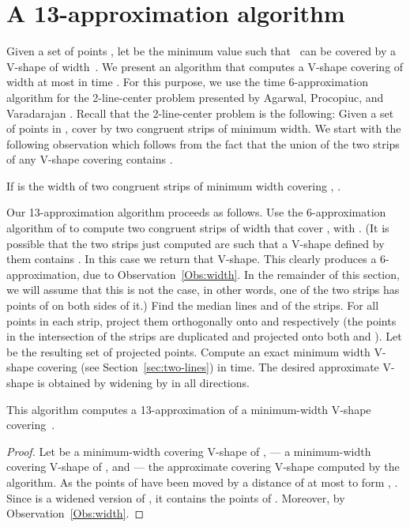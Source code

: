 \documentclass{llncs}
\begin{document}
\section{A 13-approximation algorithm}
\label{sec:13-approx}

Given a set of points , let  be the minimum value such that~
can be covered by a V-shape of width~.
We present an algorithm that computes a V-shape covering  of width at most  in time .
For this purpose, we use the  time 6-approximation algorithm for the 2-line-center problem  presented by Agarwal, Procopiuc, and Varadarajan \cite{2-line-center}.
Recall that the 2-line-center problem is the following: Given a set  of 
points in , cover  by two congruent strips of minimum
width.  We start with the following observation which follows from the
fact that the union of the two strips of any V-shape covering  contains .

\begin{observation}
  \label{Obs:width}
  If  is the width of two congruent strips of minimum width covering , .
\end{observation}


Our 13-approximation algorithm proceeds as follows.  Use the 6-approximation
algorithm of \cite{2-line-center} to compute two congruent
strips of width  that cover , with .
(It is possible that the two strips just computed are such
that a V-shape defined by them contains .  In this case we return
that V-shape.  This clearly produces a 6-approximation, due to
Observation~\ref{Obs:width}.  In the remainder of this section, we
will assume that this is not the case, in other words, one of the two
strips has points of  on both sides of it.)
Find the median lines  and  of
the strips.  For all points in each strip, project them orthogonally
onto 
and  respectively (the points in the intersection of the
strips are duplicated and projected onto both  and ).
Let  be the resulting set of projected points.  Compute an exact
minimum width V-shape  covering  (see Section~\ref{sec:two-lines})
in  time.  The desired approximate V-shape  is
obtained by widening  by  in all directions.



\begin{theorem}
This algorithm computes a 13-approximation of a minimum-width V-shape covering~.
\end{theorem}
\begin{proof}
  Let  be a minimum-width covering V-shape of ,  --- a
  minimum-width covering V-shape of , and  --- the approximate
  covering V-shape computed by the algorithm.
  As the points of  have been moved by a distance
  of at most  to form , .
  Since  is a widened version of , it contains the points
  of .  Moreover,  by
  Observation~\ref{Obs:width}. \hfill 
\end{proof}
\end{document}
